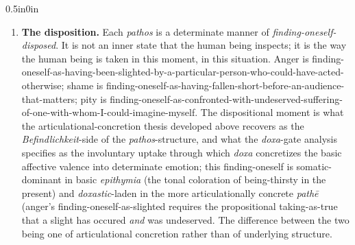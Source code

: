 \begin{adjustwidth}{0.5in}{0in}
    \begin{enumerate}
        \item \textbf{The disposition.} Each \textit{pathos} is a determinate manner of \textit{finding-oneself-disposed}. It is not an inner state that the human being inspects; it is the way the human being is taken in this moment, in this situation. Anger is finding-oneself-as-having-been-slighted-by-a-particular-person-who-could-have-acted-otherwise; shame is finding-oneself-as-having-fallen-short-before-an-audience-that-matters; pity is finding-oneself-as-confronted-with-undeserved-suffering-of-one-with-whom-I-could-imagine-myself. The dispositional moment is what the articulational-concretion thesis developed above recovers as the \textit{Befindlichkeit}-side of the \textit{pathos}-structure, and what the \textit{doxa}-gate analysis specifies as the involuntary uptake through which \textit{doxa} concretizes the basic affective valence into determinate emotion; this finding-oneself is somatic-dominant in basic \textit{epithymia} (the tonal coloration of being-thirsty in the present) and \textit{doxastic}-laden in the more articulationally concrete \textit{pathē} (anger's finding-oneself-as-slighted requires the propositional taking-as-true that a slight has occured \textit{and} was undeserved. The difference between the two being one of articulational concretion rather than of underlying structure.
        

\end{enumerate}
\end{adjustwidth}
